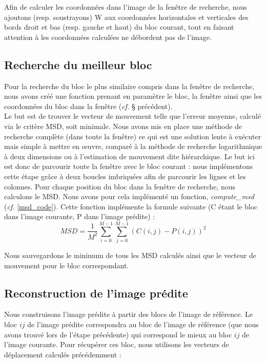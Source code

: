 \documentclass[a4paper, 12pt]{article}
\begin{document}
Afin de calculer les coordonnées dans l'image de la fenêtre de recherche, nous ajoutons (resp. soustrayons) W aux coordonnées horizontales et verticales des bords droit et bas (resp. gauche et haut) du bloc courant, tout en faisant attention à les coordonnées calculées ne débordent pas de l'image.


\subsection{Recherche du meilleur bloc}

Pour la recherche du bloc le plus similaire compris dans la fenêtre de recherche, nous avons créé une fonction prenant en paramètre le bloc, la fenêtre ainsi que les coordonnées du bloc dans la fenêtre (\textit{cf.} § précédent).\\

Le but est de trouver le vecteur de mouvement telle que l'erreur moyenne, calculé via le critère MSD, soit minimale. Nous avons mis en place une méthode de recherche complète (dans toute la fenêtre) ce qui est une solution lente à exécuter mais simple à mettre en œuvre, comparé à la méthode de recherche logarithmique à deux dimensions ou à l'estimation de mouvement dite hiérarchique. Le but ici est donc de parcourir toute la fenêtre avec le bloc courant : nous implémentons cette étape grâce à deux boucles imbriquées afin de parcourir les lignes et les colonnes. Pour chaque position du bloc dans la fenêtre de recherche, nous calculons le MSD. Nous avons pour cela implémenté un fonction, \textit{compute\_msd} (\textit{cf.} \ref{msd_code}). Cette fonction implémente la formule suivante (C étant le bloc dans l'image courante, P dans l'image prédite) :
\[ MSD = \frac{1}{M^2}\sum_{i=0}^{M-1}\sum_{j=0}^{M-1}(C(i,j) - P(i,j))^2 \]

Nous sauvegardons le minimum de tous les MSD calculés ainsi que le vecteur de mouvement pour le bloc correspondant.

\subsection{Reconstruction de l'image prédite}

Nous construisons l'image prédite à partir des blocs de l'image de référence. Le bloc $ij$ de l'image prédite correspondra au bloc de l'image de référence (que nous avons trouvé lors de l'étape précédente) qui correspond le mieux au bloc $ij$ de l'image courante. Pour récupérer ces bloc, nous utilisons les vecteurs de déplacement calculés précédemment : 
\end{document}
